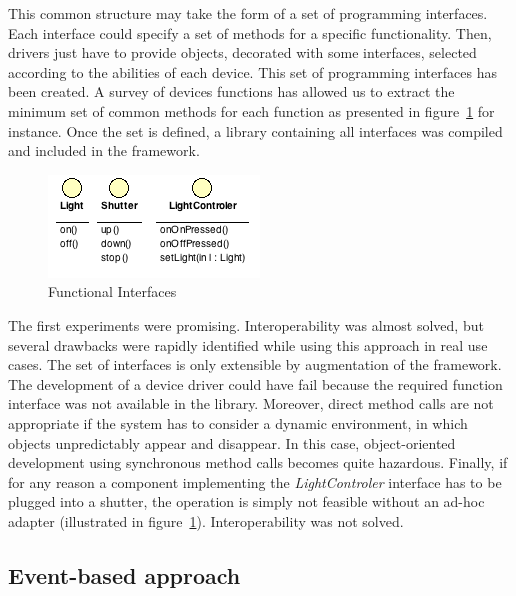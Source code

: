 This common structure may take the form of a set of programming interfaces. Each interface could specify a set of methods for a specific functionality. Then, drivers just have to provide objects, decorated with some interfaces, selected according to the abilities of each device. This set of programming interfaces has been created. A survey of devices functions has allowed us to extract the minimum set of common methods for each function as presented in figure~\ref{fig:interfaces} for instance. Once the set is defined, a library containing all interfaces was compiled and included in the framework.\\
\begin{figure}[h!]
\centering
\includegraphics{part2/pics/FunctionalInterfaces.png}
\caption{Functional Interfaces}
\label{fig:interfaces}
\end{figure}
The first experiments were promising. Interoperability was almost solved, but several drawbacks were rapidly identified while using this approach in real use cases. The set of interfaces is only extensible by augmentation of the framework. The development of a device driver could have fail because the required function interface was not available in the library. Moreover, direct method calls are not appropriate if the system has to consider a dynamic environment, in which objects unpredictably appear and disappear. In this case, object-oriented development using synchronous method calls becomes quite hazardous. Finally, if for any reason a component implementing the {\it LightControler} interface has to be plugged into a shutter, the operation is simply not feasible without an ad-hoc adapter (illustrated in figure~\ref{fig:interfaces}). Interoperability was not solved.\\


\subsection{Event-based approach}

